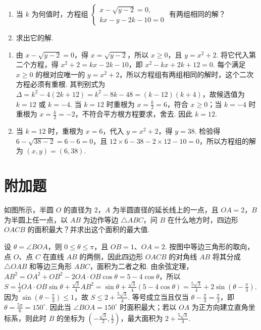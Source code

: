 \begin{problem}
\begin{enumerate}
\item 当 \(k\) 为何值时，方程组 \(\begin{cases}
x-\sqrt{y-2}=0,\\
kx-y-2k-10=0
\end{cases}\) 有两组相同的解？

\item 求出它的解.
\end{enumerate}
\end{problem}

\begin{solution}
\begin{enumerate}
\item 由 \(x-\sqrt{y-2}=0\)，得 \(x=\sqrt{y-2}\)，所以 \(x\ge0\)，且 \(y=x^2+2\). 将它代入第二个方程，得 \(x^2+2=kx-2k-10\)，即 \(x^2-kx+2k+12=0\). 每个满足 \(x\ge0\) 的根对应唯一的 \(y=x^2+2\)，所以方程组有两组相同的解时，这个二次方程必须有重根. 其判别式为 \(\Delta=k^2-4(2k+12)=k^2-8k-48=(k-12)(k+4)\)，故候选值为 \(k=12\) 或 \(k=-4\). 当 \(k=12\) 时重根为 \(x=\frac{k}{2}=6\)，符合 \(x\ge0\)；当 \(k=-4\) 时重根为 \(x=\frac{k}{2}=-2\)，不符合平方根方程要求，舍去. 因此 \(k=12\).

\item 当 \(k=12\) 时，重根为 \(x=6\)，代入 \(y=x^2+2\)，得 \(y=38\). 检验得 \(6-\sqrt{38-2}=6-6=0\)，且 \(12\times6-38-2\times12-10=0\)，所以方程组的解为 \((x,y)=(6,38)\).
\end{enumerate}
\end{solution}


\section{附加题}

\begin{problem}
如图所示，半圆 \(O\) 的直径为 \(2\)，\(A\) 为半圆直径的延长线上的一点，且 \(OA=2\)，\(B\) 为半圆上任一点，以 \(AB\) 为边作等边 \(\triangle ABC\)，问 \(B\) 在什么地方时，四边形 \(OACB\) 的面积最大？并求出这个面积的最大值.

\end{problem}

\begin{solution}
设 \(\theta=\angle BOA\)，则 \(0\le\theta\le\pi\)，且 \(OB=1\)、\(OA=2\). 按图中等边三角形的取向，点 \(O\)、点 \(C\) 在直线 \(AB\) 的两侧，因此四边形 \(OACB\) 的对角线 \(AB\) 将其分成 \(\triangle OAB\) 和等边三角形 \(ABC\)，面积为二者之和. 由余弦定理，\(AB^2=OA^2+OB^2-2OA\cdot OB\cos\theta=5-4\cos\theta\)，所以 \(S=\frac12OA\cdot OB\sin\theta+\frac{\sqrt3}{4}AB^2=\sin\theta+\frac{\sqrt3}{4}(5-4\cos\theta)=\frac{5\sqrt3}{4}+2\sin\left(\theta-\frac{\pi}{3}\right)\). 因为 \(\sin\left(\theta-\frac{\pi}{3}\right)\le1\)，故 \(S\le2+\frac{5\sqrt3}{4}\). 等号成立当且仅当 \(\theta-\frac{\pi}{3}=\frac{\pi}{2}\)，即 \(\theta=\frac{5\pi}{6}=150^\circ\). 因此当 \(\angle BOA=150^\circ\) 时面积最大；若以 \(OA\) 为正方向建立直角坐标系，则此时 \(B\) 的坐标为 \(\left(-\frac{\sqrt3}{2},\frac12\right)\)，最大面积为 \(2+\frac{5\sqrt3}{4}\).
\end{solution}

